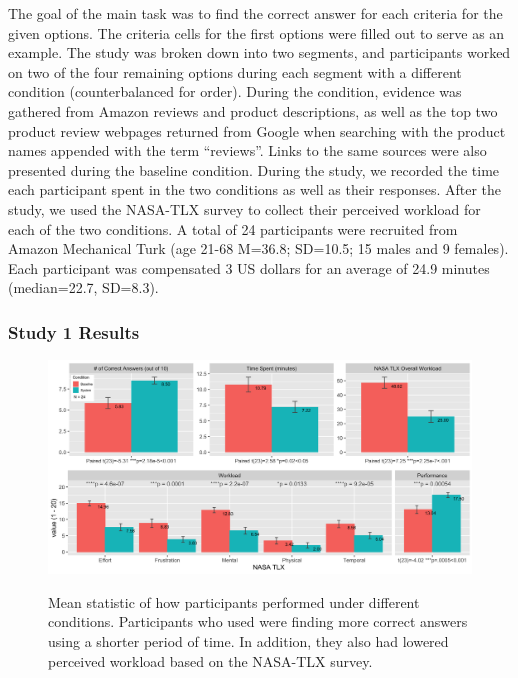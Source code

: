 The goal of the main task was to find the correct answer for each criteria for the given options. The criteria cells for the first options were filled out to serve as an example. The study was broken down into two segments, and participants worked on two of the four remaining options during each segment with a different condition (counterbalanced for order). During the \SYSTEM condition, evidence was gathered from Amazon reviews and product descriptions, as well as the top two product review webpages returned from Google when searching with the product names appended with the term “reviews''. Links to the same sources were also presented during the baseline condition. During the study, we recorded the time each participant spent in the two conditions as well as their responses. After the study, we used the NASA-TLX survey to collect their perceived workload for each of the two conditions. A total of 24 participants were recruited from Amazon Mechanical Turk (age 21-68 M=36.8; SD=10.5; 15 males and 9 females).  Each participant was compensated 3 US dollars for an average of 24.9 minutes (median=22.7, SD=8.3).

\subsubsection{Study 1 Results}



\begin{figure}
    \centering
    \textcolor{gray}{\includegraphics[width=1\textwidth]{Chapters/Mesh/figures/Interaction.png}}
    \caption[Mean statistic for the objective criteria study.]{Mean statistic of how participants performed under different conditions. Participants who used \SYSTEM were finding more correct answers using a shorter period of time. In addition, they also had lowered perceived workload based on the NASA-TLX survey.}
    \label{fig:interaction}
\end{figure}


